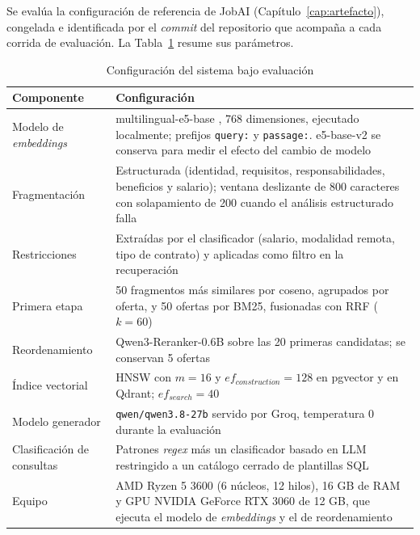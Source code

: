 Se evalúa la configuración de referencia de JobAI (Capítulo~\ref{cap:artefacto}), congelada e identificada por el \textit{commit} del repositorio que acompaña a cada corrida de evaluación. La Tabla~\ref{tab:met-config} resume sus parámetros.

\begin{table}[htbp!]
    \centering
    \caption{Configuración del sistema bajo evaluación}
    \label{tab:met-config}
    \begin{tabular}{|p{5cm}|p{9.2cm}|}
        \hline
        \textbf{Componente} & \textbf{Configuración} \\
        \hline
        Modelo de \textit{embeddings} & multilingual-e5-base \citep{Wang2024mE5}, 768 dimensiones, ejecutado localmente; prefijos \texttt{query:} y \texttt{passage:}. e5-base-v2 \citep{Wang2022E5} se conserva para medir el efecto del cambio de modelo \\
        \hline
        Fragmentación & Estructurada (identidad, requisitos, responsabilidades, beneficios y salario); ventana deslizante de 800 caracteres con solapamiento de 200 cuando el análisis estructurado falla \\
        \hline
        Restricciones & Extraídas por el clasificador (salario, modalidad remota, tipo de contrato) y aplicadas como filtro en la recuperación \\
        \hline
        Primera etapa & 50 fragmentos más similares por coseno, agrupados por oferta, y 50 ofertas por BM25, fusionadas con RRF ($k = 60$) \\
        \hline
        Reordenamiento & Qwen3-Reranker-0.6B \citep{Zhang2025Qwen3} sobre las 20 primeras candidatas; se conservan 5 ofertas \\
        \hline
        Índice vectorial & HNSW con $m=16$ y $ef_{construction}=128$ en pgvector y en Qdrant; $ef_{search}=40$ \\
        \hline
        Modelo generador & \texttt{qwen/qwen3.8-27b} servido por Groq, temperatura 0 durante la evaluación \\
        \hline
        Clasificación de consultas & Patrones \textit{regex} más un clasificador basado en LLM restringido a un catálogo cerrado de plantillas SQL \\
        \hline
        Equipo & AMD Ryzen 5 3600 (6 núcleos, 12 hilos), 16 GB de RAM y GPU NVIDIA GeForce RTX 3060 de 12 GB, que ejecuta el modelo de \textit{embeddings} y el de reordenamiento \\
        \hline
    \end{tabular}
\end{table}

